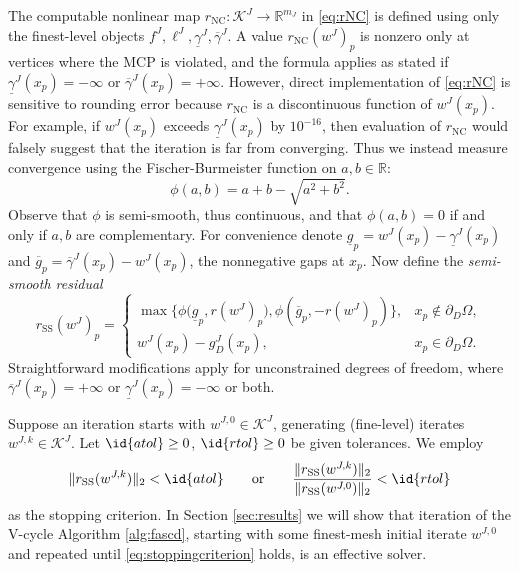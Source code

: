 \documentclass[review,hidelinks,onefignum,onetabnum]{siamart220329}
\newcommand{\RR}{\mathbb{R}}
\newcommand{\rNC}{r_{\text{NC}}}
\newcommand{\rSS}{r_{\text{SS}}}
\begin{document}
The computable nonlinear map $\rNC : \mathcal{K}^J \to \RR^{m_J}$ in \eqref{eq:rNC} is defined using only the finest-level objects $f^J,\ell^J,\underline{\gamma}^J,\overline{\gamma}^J$.  A value $\rNC(w^J)_p$ is nonzero only at vertices where the MCP is violated, and the formula applies as stated if $\underline{\gamma}^J(x_p)=-\infty$ or $\overline{\gamma}^J(x_p)=+\infty$.  However, direct implementation of \eqref{eq:rNC} is sensitive to rounding error because $\rNC$ is a discontinuous function of $w^J(x_p)$.  For example, if $w^J(x_p)$ exceeds $\underline{\gamma}^J(x_p)$ by $10^{-16}$, then evaluation of $\rNC$ would falsely suggest that the iteration is far from converging.  Thus we instead measure convergence using the Fischer-Burmeister function \cite{BensonMunson2006,Ulbrich2011} on $a,b\in\RR$:
\begin{equation}
\phi(a,b) = a + b - \sqrt{a^2 + b^2}. \label{eq:phiFB}
\end{equation}
Observe that $\phi$ is semi-smooth, thus continuous, and that $\phi(a,b)=0$ if and only if $a,b$ are complementary.  For convenience denote $\underline{g}_p = w^J(x_p) - \underline{\gamma}^J(x_p)$ and $\overline{g}_p = \overline{\gamma}^J(x_p) - w^J(x_p)$, the nonnegative gaps at $x_p$.  Now define the \emph{semi-smooth residual}
\begin{equation}
\rSS(w^J)_p = \begin{cases}
\max\big\{\phi\big(\underline{g}_p, r(w^J)_p\big), \phi\left(\overline{g}_p, -r(w^J)_p\right)\big\}, & x_p \notin \partial_D\Omega, \\
w^J(x_p) - g_D^J(x_p), & x_p \in \partial_D\Omega.
\end{cases} \label{eq:rSS}
\end{equation}
Straightforward modifications apply for unconstrained degrees of freedom, where $\overline{\gamma}^J(x_p) = +\infty$ or $\underline{\gamma}^J(x_p) = -\infty$ or both.

Suppose an iteration starts with $w^{J,0} \in \mathcal{K}^J$, generating (fine-level) iterates $w^{J,k} \in \mathcal{K}^J$.  Let $\id{atol}\ge 0$, $\id{rtol}\ge 0$ be given tolerances.  We employ
\begin{equation}
\|\rSS(w^{J,k})\|_2 < \id{atol} \qquad \text{or} \qquad \frac{\|\rSS(w^{J,k})\|_2}{\|\rSS(w^{J,0})\|_2} < \id{rtol} \label{eq:stoppingcriterion}
\end{equation}
as the stopping criterion.  In Section \ref{sec:results} we will show that iteration of the V-cycle Algorithm \ref{alg:fascd}, starting with some finest-mesh initial iterate $w^{J,0}$ and repeated until \eqref{eq:stoppingcriterion} holds, is an effective solver.
\end{document}

